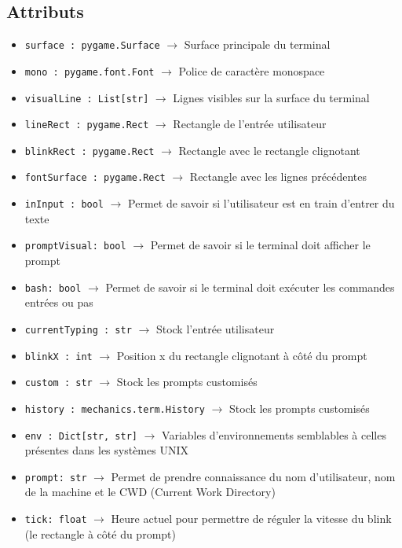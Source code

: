 \documentclass{report}
\begin{document}
\subsection*{Attributs}
\begin{itemize}
  \item \texttt{surface : pygame.Surface}		$\rightarrow$ Surface principale du terminal
  \item \texttt{mono : pygame.font.Font}		$\rightarrow$ Police de caractère monospace
  \item \texttt{visualLine : List[str]}		$\rightarrow$ Lignes visibles sur la surface du terminal
  \item \texttt{lineRect : pygame.Rect}		$\rightarrow$ Rectangle de l’entrée utilisateur
  \item \texttt{blinkRect : pygame.Rect}		$\rightarrow$ Rectangle avec le rectangle clignotant
  \item \texttt{fontSurface : pygame.Rect}		$\rightarrow$ Rectangle avec les lignes précédentes
  \item \texttt{inInput : bool}			$\rightarrow$ Permet de savoir si l’utilisateur est en train d'entrer du texte
  \item \texttt{promptVisual: bool}			$\rightarrow$ Permet de savoir si le terminal doit afficher le prompt
  \item \texttt{bash: bool}				$\rightarrow$ Permet de savoir si le terminal doit exécuter les commandes entrées ou pas
  \item \texttt{currentTyping : str}		$\rightarrow$ Stock l’entrée utilisateur
  \item \texttt{blinkX : int}			$\rightarrow$ Position x du rectangle clignotant à côté du prompt
  \item \texttt{custom : str}			$\rightarrow$ Stock les prompts customisés
  \item \texttt{history : mechanics.term.History}	$\rightarrow$ Stock les prompts customisés
  \item \texttt{env : Dict[str, str]}		$\rightarrow$ Variables d'environnements semblables à celles présentes dans les systèmes UNIX
  \item \texttt{prompt: str}		$\rightarrow$ Permet de prendre connaissance du nom d’utilisateur, nom de la machine et le CWD (Current Work Directory)
  \item \texttt{tick: float}		$\rightarrow$ Heure actuel pour permettre de réguler la vitesse du blink (le rectangle à côté du prompt)
\end{itemize}
\end{document}
